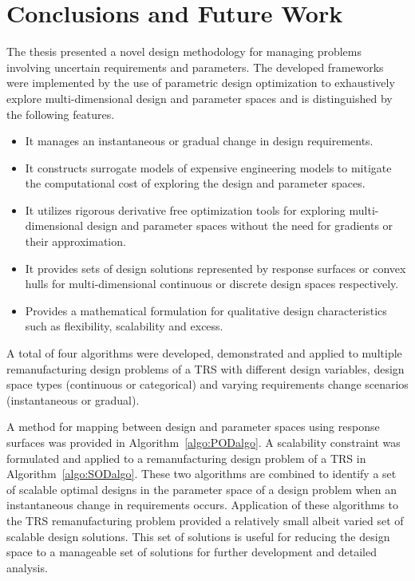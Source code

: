 \chapter{Conclusions and Future Work}
\label{ch:conclusion}

The thesis presented a novel design methodology for managing problems involving uncertain requirements and parameters. The developed frameworks were implemented by the use of parametric design optimization to exhaustively explore multi-dimensional design and parameter spaces and is distinguished by the following features.

\begin{itemize}
    \item It manages an instantaneous or gradual change in design requirements.
    \item It constructs surrogate models of expensive engineering models to mitigate the computational cost of exploring the design and parameter spaces.
    \item It utilizes rigorous derivative free optimization tools for exploring multi-dimensional design and parameter spaces without the need for gradients or their approximation.
    \item It provides sets of design solutions represented by response surfaces or convex hulls for multi-dimensional continuous or discrete design spaces respectively.
    \item Provides a mathematical formulation for qualitative design characteristics such as flexibility, scalability and excess.
\end{itemize}

A total of four algorithms were developed, demonstrated and applied to multiple remanufacturing design problems of a \ac{TRS} with different design variables, design space types (continuous or categorical) and varying requirements change scenarios (instantaneous or gradual). 

A method for mapping between design and parameter spaces using response surfaces was provided in Algorithm~\ref{algo:PODalgo}. A scalability constraint was formulated and applied to a remanufacturing design problem of a \ac{TRS} in Algorithm~\ref{algo:SODalgo}. These two algorithms are combined to identify a set of scalable optimal designs in the parameter space of a design problem when an instantaneous change in requirements occurs. Application of these algorithms to the \ac{TRS} remanufacturing problem provided a relatively small albeit varied set of scalable design solutions. This set of solutions is useful for reducing the design space to a manageable set of solutions for further development and detailed analysis.

